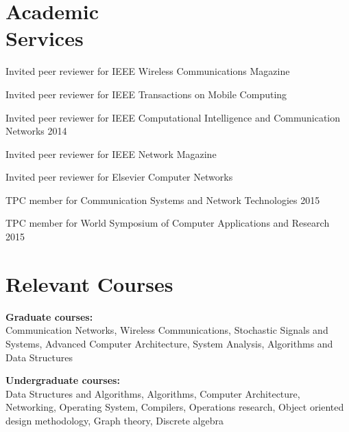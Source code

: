 \documentclass[margin,line]{resume}
\begin{document}
\begin{resume}
    \section{\mysidestyle Academic\\Services}
\begin{list2}
\item Invited peer reviewer for IEEE Wireless Communications Magazine
\item Invited peer reviewer for IEEE Transactions on Mobile Computing
\item Invited peer reviewer for IEEE Computational Intelligence and Communication Networks 2014
\item Invited peer reviewer for IEEE Network Magazine
\item Invited peer reviewer for Elsevier Computer Networks
\item TPC member for Communication Systems and Network Technologies 2015
\item TPC member for World Symposium of Computer Applications and Research 2015
\end{list2}


%
\section{\mysidestyle Relevant Courses} 
\begin{list2}
\item \textbf{Graduate courses:}\\
Communication Networks, Wireless Communications, Stochastic Signals and Systems, Advanced Computer Architecture, System Analysis, Algorithms and Data Structures\\

\item \textbf{Undergraduate courses:}\\
Data Structures and Algorithms, Algorithms, Computer Architecture, Networking, Operating System, Compilers, Operations research, Object oriented design methodology, Graph theory, Discrete algebra
\end{list2}


\end{resume}
\end{document}
